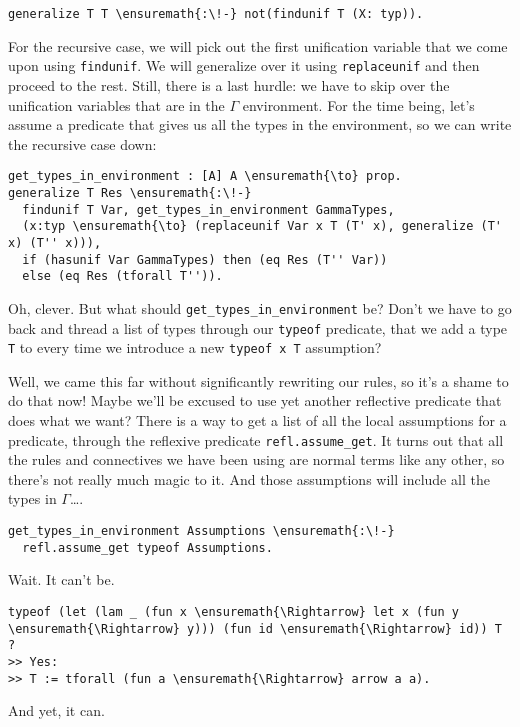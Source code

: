 \begin{verbatim}
generalize T T \ensuremath{:\!-} not(findunif T (X: typ)).
\end{verbatim}

\importantCodeblockEnd{}

For the recursive case, we will pick out the first unification variable
that we come upon using \texttt{findunif}. We will generalize over it
using \texttt{replaceunif} and then proceed to the rest. Still, there is
a last hurdle: we have to skip over the unification variables that are
in the \(\Gamma\) environment. For the time being, let's assume a
predicate that gives us all the types in the environment, so we can
write the recursive case down:

\importantCodeblock{}

\begin{verbatim}
get_types_in_environment : [A] A \ensuremath{\to} prop.
generalize T Res \ensuremath{:\!-}
  findunif T Var, get_types_in_environment GammaTypes,
  (x:typ \ensuremath{\to} (replaceunif Var x T (T' x), generalize (T' x) (T'' x))),
  if (hasunif Var GammaTypes) then (eq Res (T'' Var))
  else (eq Res (tforall T'')).
\end{verbatim}

\importantCodeblockEnd{}

\identDialog

\heroSTUDENT{} Oh, clever. But what should
\texttt{get\_types\_in\_environment} be? Don't we have to go back and
thread a list of types through our \texttt{typeof} predicate, that we
add a type \texttt{T} to every time we introduce a new
\texttt{typeof\ x\ T} assumption?

\heroADVISOR{} Well, we came this far without significantly rewriting our
rules, so it's a shame to do that now! Maybe we'll be excused to use yet
another reflective predicate that does what we want? There is a way to
get a list of all the local assumptions for a predicate, through the
reflexive predicate \texttt{refl.assume\_get}. It turns out that all the
rules and connectives we have been using are normal \lamprolog terms
like any other, so there's not really much magic to it. And those
assumptions will include all the types in \(\Gamma\)\ldots{}.

\importantCodeblock{}

\begin{verbatim}
get_types_in_environment Assumptions \ensuremath{:\!-}
  refl.assume_get typeof Assumptions.
\end{verbatim}

\importantCodeblockEnd{}

\heroSTUDENT{} Wait. It can't be.

\begin{verbatim}
typeof (let (lam _ (fun x \ensuremath{\Rightarrow} let x (fun y \ensuremath{\Rightarrow} y))) (fun id \ensuremath{\Rightarrow} id)) T ?
>> Yes:
>> T := tforall (fun a \ensuremath{\Rightarrow} arrow a a).
\end{verbatim}

\heroADVISOR{} And yet, it can.
